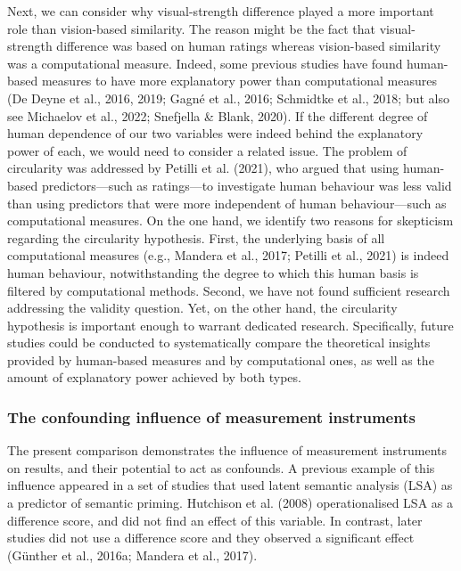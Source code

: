 \documentclass[
  12pt,
  man,floatsintext]{apa7}
\begin{document}
Next, we can consider why visual-strength difference played a more important role than vision-based similarity. The reason might be the fact that visual-strength difference was based on human ratings whereas vision-based similarity was a computational measure. Indeed, some previous studies have found human-based measures to have more explanatory power than computational measures (De Deyne et al., 2016, 2019; Gagné et al., 2016; Schmidtke et al., 2018; but also see Michaelov et al., 2022; Snefjella \& Blank, 2020). If the different degree of human dependence of our two variables were indeed behind the explanatory power of each, we would need to consider a related issue. The problem of circularity was addressed by Petilli et al. (2021), who argued that using human-based predictors---such as ratings---to investigate human behaviour was less valid than using predictors that were more independent of human behaviour---such as computational measures. On the one hand, we identify two reasons for skepticism regarding the circularity hypothesis. First, the underlying basis of all computational measures (e.g., Mandera et al., 2017; Petilli et al., 2021) is indeed human behaviour, notwithstanding the degree to which this human basis is filtered by computational methods. Second, we have not found sufficient research addressing the validity question. Yet, on the other hand, the circularity hypothesis is important enough to warrant dedicated research. Specifically, future studies could be conducted to systematically compare the theoretical insights provided by human-based measures and by computational ones, as well as the amount of explanatory power achieved by both types.

\hypertarget{the-confounding-influence-of-measurement-instruments}{%
\subsubsection{The confounding influence of measurement instruments}\label{the-confounding-influence-of-measurement-instruments}}

The present comparison demonstrates the influence of measurement instruments on results, and their potential to act as confounds. A previous example of this influence appeared in a set of studies that used latent semantic analysis (LSA) as a predictor of semantic priming. Hutchison et al. (2008) operationalised LSA as a difference score, and did not find an effect of this variable. In contrast, later studies did not use a difference score and they observed a significant effect (Günther et al., 2016a; Mandera et al., 2017).
\end{document}
